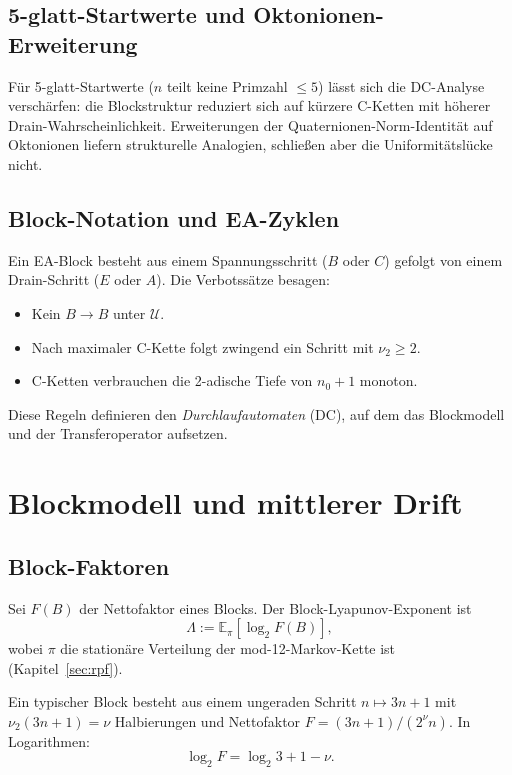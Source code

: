 \documentclass[12pt,a4paper]{article}
\newcommand{\vii}{\nu_2}
\newcommand{\U}{\mathcal{U}}
\newcommand{\Lam}{\Lambda}
\begin{document}
\subsection{5-glatt-Startwerte und Oktonionen-Erweiterung}

Für 5-glatt-Startwerte ($n$ teilt keine Primzahl $\leq 5$) lässt sich die
DC-Analyse verschärfen: die Blockstruktur reduziert sich auf kürzere
C-Ketten mit höherer Drain-Wahrscheinlichkeit. Erweiterungen der
Quaternionen-Norm-Identität auf Oktonionen liefern strukturelle Analogien,
schließen aber die Uniformitätslücke nicht.

\subsection{Block-Notation und EA-Zyklen}

Ein EA-Block besteht aus einem Spannungsschritt ($B$ oder $C$) gefolgt von
einem Drain-Schritt ($E$ oder $A$). Die Verbotssätze besagen:
\begin{itemize}[leftmargin=1.5em]
\item Kein $B\to B$ unter $\U$.
\item Nach maximaler C-Kette folgt zwingend ein Schritt mit $\vii \geq 2$.
\item C-Ketten verbrauchen die 2-adische Tiefe von $n_0+1$ monoton.
\end{itemize}
Diese Regeln definieren den \emph{Durchlaufautomaten} (DC), auf dem das
Blockmodell und der Transferoperator aufsetzen.

\section{Blockmodell und mittlerer Drift}
\label{sec:lyapunov}

\subsection{Block-Faktoren}

Sei $F(B)$ der Nettofaktor eines Blocks. Der Block-Lyapunov-Exponent ist
\[
  \Lam := \mathbb{E}_\pi[\log_2 F(B)],
\]
wobei $\pi$ die stationäre Verteilung der mod-12-Markov-Kette ist
(Kapitel~\ref{sec:rpf}).

Ein typischer Block besteht aus einem ungeraden Schritt $n \mapsto 3n+1$
mit $\vii(3n+1)=\nu$ Halbierungen und Nettofaktor
$F = (3n+1)/(2^\nu n)$. In Logarithmen:
\[
  \log_2 F = \log_2 3 + 1 - \nu.
\]
\end{document}
